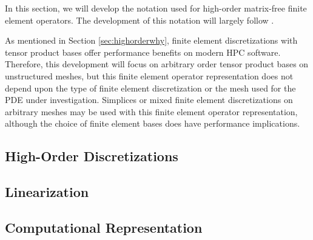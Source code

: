 In this section, we will develop the notation used for high-order matrix-free finite element operators.
The development of this notation will largely follow \cite{brown2010efficient}.

As mentioned in Section \ref{sec:highorderwhy}, finite element discretizations with tensor product bases offer performance benefits on modern HPC software.
Therefore, this development will focus on arbitrary order tensor product bases on unstructured meshes, but this finite element operator representation does not depend upon the type of finite element discretization or the mesh used for the PDE under investigation.
Simplices or mixed finite element discretizations on arbitrary meshes may be used with this finite element operator representation, although the choice of finite element bases does have performance implications.

\subsection{High-Order Discretizations} \label{sec:highorderdiscretizations}


\subsection{Linearization}


\subsection{Computational Representation}

